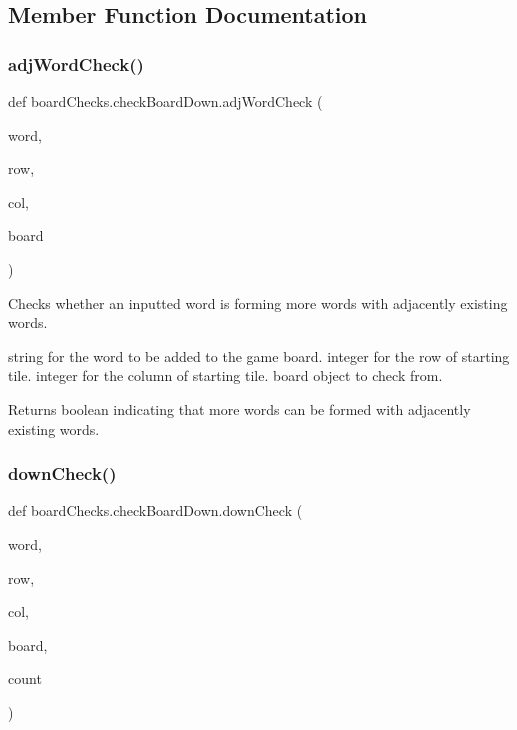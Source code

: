 \subsection{Member Function Documentation}
\mbox{\label{classboard_checks_1_1check_board_down_a20d1c2afa3247e7889357f2a492a5e28}} 
\subsubsection{\texorpdfstring{adj\+Word\+Check()}{adjWordCheck()}}
{\footnotesize\ttfamily def board\+Checks.\+check\+Board\+Down.\+adj\+Word\+Check (\begin{DoxyParamCaption}\item[{}]{word,  }\item[{}]{row,  }\item[{}]{col,  }\item[{}]{board }\end{DoxyParamCaption})}



Checks whether an inputted word is forming more words with adjacently existing words. 

string for the word to be added to the game board.  integer for the row of starting tile.  integer for the column of starting tile.  board object to check from. \begin{DoxyReturn}{Returns}
boolean indicating that more words can be formed with adjacently existing words. 
\end{DoxyReturn}
\mbox{\label{classboard_checks_1_1check_board_down_a413bed8316b61ab829d954398bc884e8}} 
\subsubsection{\texorpdfstring{down\+Check()}{downCheck()}}
{\footnotesize\ttfamily def board\+Checks.\+check\+Board\+Down.\+down\+Check (\begin{DoxyParamCaption}\item[{}]{word,  }\item[{}]{row,  }\item[{}]{col,  }\item[{}]{board,  }\item[{}]{count }\end{DoxyParamCaption})}



